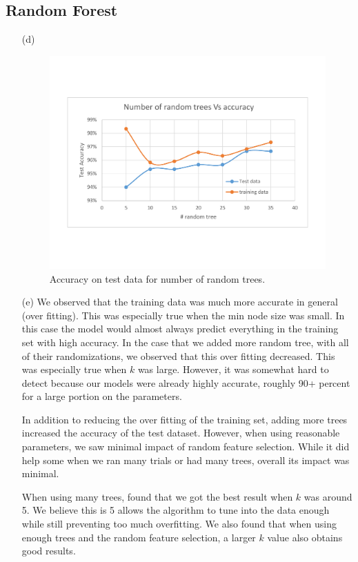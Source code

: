 \documentclass[a4paper]{article}
\begin{document}
\subsection{Random Forest}
\begin{enumerate}
	\item[(d)] $ $
	
	\begin{figure}[H]
		\begin{center}
			\includegraphics[width=5in]{random.pdf}
			\caption{Accuracy on test data for number of random trees.}
		\end{center}
	\end{figure}
	
\item[(e)] We observed that the training data was much more accurate in general (over fitting). This was especially true when the min node size was small. In this case the model would almost always predict everything in the training set with high accuracy. In the case that we added more random tree, with all of their randomizations, we observed that this over fitting decreased. This was especially true when $k$ was large. However, it was somewhat hard to detect because our models were already highly accurate, roughly 90+ percent for a large portion on the parameters.

In addition to reducing the over fitting of the training set, adding more trees increased the accuracy of the test dataset. However, when using reasonable parameters, we saw minimal impact of random feature selection. While it did help some when we ran many trials or had many trees, overall its impact was minimal. 

When using many trees, found that we got the best result when $k$ was around 5. We believe this is 5 allows the algorithm to tune into the data enough while still preventing too much overfitting. We also found that when using enough trees and the random feature selection, a larger $k$ value also obtains good results.

	
\end{enumerate}
\end{document}
